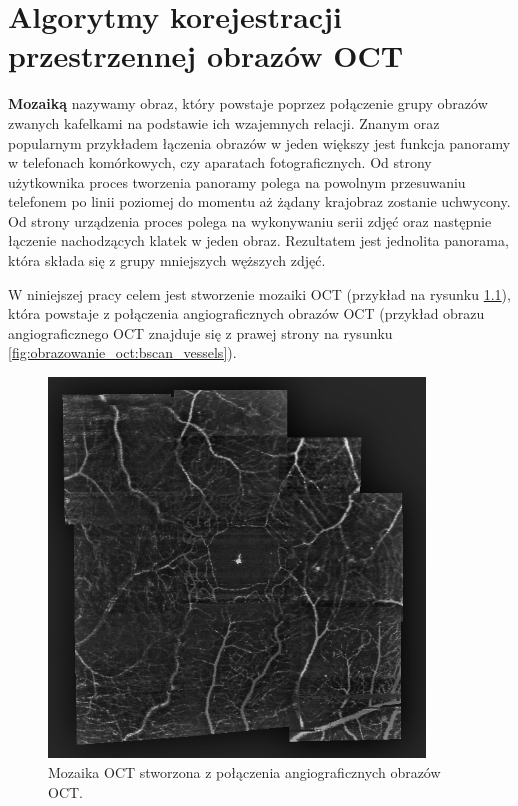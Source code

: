 %
\chapter{Algorytmy korejestracji przestrzennej obrazów OCT}
\label{sec:algorytmy_korejestracji}

\textbf{Mozaiką} nazywamy obraz, który powstaje poprzez połączenie grupy obrazów zwanych kafelkami na podstawie ich wzajemnych relacji. Znanym oraz popularnym przykładem łączenia obrazów w jeden większy jest funkcja panoramy w telefonach komórkowych, czy aparatach fotograficznych. Od strony użytkownika proces tworzenia panoramy polega na powolnym przesuwaniu telefonem po linii poziomej do momentu aż żądany krajobraz zostanie uchwycony. Od strony urządzenia proces polega na wykonywaniu serii zdjęć oraz następnie łączenie nachodzących klatek w jeden obraz. Rezultatem jest jednolita panorama, która składa się z grupy mniejszych węższych zdjęć.

W niniejszej pracy celem jest stworzenie mozaiki OCT (przykład na rysunku \ref{fig:algorytmy_korejestracji:mosaic}), która powstaje z połączenia angiograficznych obrazów OCT (przykład obrazu angiograficznego OCT znajduje się z prawej strony na rysunku \ref{fig:obrazowanie_oct:bscan_vessels}).

\begin{figure}[H]
  \centering
  \includegraphics[width=10cm]{gfx/mosaic}
  \caption{Mozaika OCT stworzona z połączenia angiograficznych obrazów OCT.}
  \label{fig:algorytmy_korejestracji:mosaic}
\end{figure}

